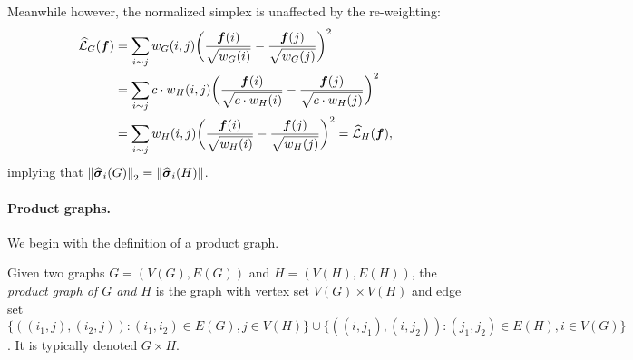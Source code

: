 Meanwhile however, the normalized simplex is unaffected by the re-weighting: 
\begin{align*}\widehat{\mathcal{L}}_G(\vb*{f})&=\sum_{i\sim j}w_G(i,j)\bigg(\frac{\vb*{f}(i)}{\sqrt{w_G(i)}}-\frac{\vb*{f}(j)}{\sqrt{w_G(j)}}\bigg)^2\\
&= \sum_{i\sim j}c\cdot w_H(i,j)\bigg(\frac{\vb*{f}(i)}{\sqrt{c\cdot w_H(i)}}-\frac{\vb*{f}(j)}{\sqrt{c\cdot w_H(j)}}\bigg)^2 \\
&= \sum_{i\sim j} w_H(i,j)\bigg(\frac{\vb*{f}(i)}{\sqrt{ w_H(i)}}-\frac{\vb*{f}(j)}{\sqrt{ w_H(j)}}\bigg)^2 = \widehat{\mathcal{L}}_H(\vb*{f}),
\end{align*}
implying that $\norm{\widehat{\vb*{\sigma}}_i(G)}_2 = \norm{\widehat{\vb*{\sigma}}_i(H)}$. 

\paragraph{Product graphs.}
We begin with the definition of a product graph. 

\begin{definition}
	\label{def:product_graphs}
	Given two graphs $G=(V(G),E(G))$ and $H=(V(H), E(H))$, the \emph{product graph of $G$ and $H$} is the graph with vertex set $V(G)\times V(H)$ and edge set
	$\{((i_1,j),(i_2,j)):(i_1,i_2)\in E(G), j\in V(H)\}\cup\{((i,j_1),(i,j_2)):(j_1,j_2)\in E(H), i\in V(G)\}$. It is typically denoted $G\times H$. 
\end{definition} 

